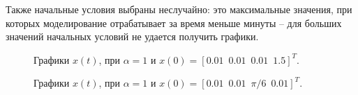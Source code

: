 Также начальные условия выбраны неслучайно: это максимальные значения, при которых моделирование отрабатывает за время меньше минуты -- для больших значений начальных условий не удается получить графики.

\begin{figure}[!h]
\caption{Графики $x(t)$, при $\alpha = 1$ и $x(0) = [0.01\, \, \,  0.01\, \, \, 0.01\, \, \, 1.5]^T$.}
\label{4_1_3}
\end{figure}


\begin{figure}[!h]
\caption{Графики $x(t)$, при $\alpha = 1$ и $x(0) = [0.01\, \, \,  0.01\, \, \, \pi/6\, \, \, 0.01]^T$.}
\label{4_1_4}
\end{figure}

